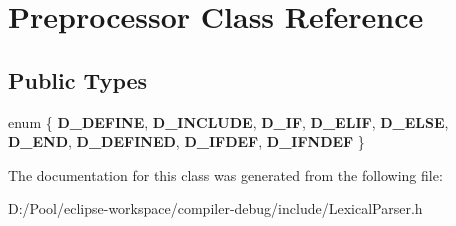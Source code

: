 \hypertarget{class_preprocessor}{}\section{Preprocessor Class Reference}
\label{class_preprocessor}
\subsection*{Public Types}
\begin{DoxyCompactItemize}
\item 
\mbox{\label{class_preprocessor_a25eb4f8a7a8ae5500a1609d080394f18}} 
enum \{ \newline
{\bfseries D\+\_\+\+D\+E\+F\+I\+NE}, 
{\bfseries D\+\_\+\+I\+N\+C\+L\+U\+DE}, 
{\bfseries D\+\_\+\+IF}, 
{\bfseries D\+\_\+\+E\+L\+IF}, 
\newline
{\bfseries D\+\_\+\+E\+L\+SE}, 
{\bfseries D\+\_\+\+E\+ND}, 
{\bfseries D\+\_\+\+D\+E\+F\+I\+N\+ED}, 
{\bfseries D\+\_\+\+I\+F\+D\+EF}, 
\newline
{\bfseries D\+\_\+\+I\+F\+N\+D\+EF}
 \}
\end{DoxyCompactItemize}


The documentation for this class was generated from the following file\+:\begin{DoxyCompactItemize}
\item 
D\+:/\+Pool/eclipse-\/workspace/compiler-\/debug/include/Lexical\+Parser.\+h\end{DoxyCompactItemize}
